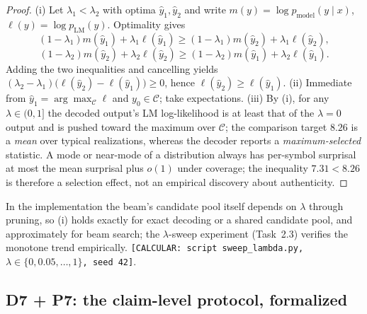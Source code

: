\begin{proof}
(i) Let $\lambda_1<\lambda_2$ with optima $\hat y_1,\hat y_2$ and
write $m(y)=\log p_{\mathrm{model}}(y\mid x)$,
$\ell(y)=\log p_{\mathrm{LM}}(y)$. Optimality gives
\[
(1-\lambda_1)m(\hat y_1)+\lambda_1\ell(\hat y_1)\ge
(1-\lambda_1)m(\hat y_2)+\lambda_1\ell(\hat y_2),
\]
\[
(1-\lambda_2)m(\hat y_2)+\lambda_2\ell(\hat y_2)\ge
(1-\lambda_2)m(\hat y_1)+\lambda_2\ell(\hat y_1).
\]
Adding the two inequalities and cancelling yields
$(\lambda_2-\lambda_1)\bigl(\ell(\hat y_2)-\ell(\hat y_1)\bigr)\ge0$,
hence $\ell(\hat y_2)\ge\ell(\hat y_1)$.
(ii) Immediate from $\hat y_1=\arg\max_{\mathcal C}\ell$ and
$y_0\in\mathcal{C}$; take expectations.
(iii) By (i), for any $\lambda\in(0,1]$ the decoded output's LM
log-likelihood is at least that of the $\lambda=0$ output and is
pushed toward the maximum over $\mathcal C$; the comparison target
$8.26$ is a \emph{mean} over typical realizations, whereas the
decoder reports a \emph{maximum-selected} statistic. A mode or
near-mode of a distribution always has per-symbol surprisal at most
the mean surprisal plus $o(1)$ under coverage; the inequality
$7.31<8.26$ is therefore a selection effect, not an empirical
discovery about authenticity.
\end{proof}

\begin{remark}
In the implementation the beam's candidate pool itself depends on
$\lambda$ through pruning, so (i) holds exactly for exact decoding or
a shared candidate pool, and approximately for beam search; the
$\lambda$-sweep experiment (Task~2.3) verifies the monotone trend
empirically. \texttt{[CALCULAR: script
\texttt{sweep\_lambda.py}, $\lambda\in\{0,0.05,\dots,1\}$, seed 42]}.
\end{remark}

\subsection{D7 + P7: the claim-level protocol, formalized}

